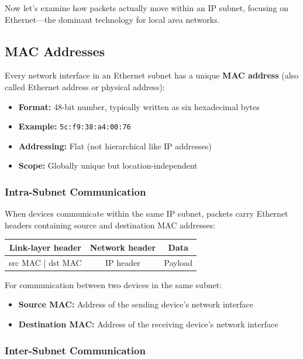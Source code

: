 \documentclass[../../compsys.tex]{subfiles}
\begin{document}
Now let's examine how packets actually move within an IP subnet, focusing on Ethernet---the dominant technology for local area networks.

\subsection{MAC Addresses}

Every network interface in an Ethernet subnet has a unique \textbf{MAC address} (also called Ethernet address or physical address):

\begin{itemize}
    \item \textbf{Format:} 48-bit number, typically written as six hexadecimal bytes
    \item \textbf{Example:} \texttt{5c:f9:38:a4:00:76}
    \item \textbf{Addressing:} Flat (not hierarchical like IP addresses)
    \item \textbf{Scope:} Globally unique but location-independent
\end{itemize}

\subsubsection{Intra-Subnet Communication}

When devices communicate within the same IP subnet, packets carry Ethernet headers containing source and destination MAC addresses:

\begin{center}
\begin{tabular}{|c|c|c|}
\hline
\textbf{Link-layer header} & \textbf{Network header} & \textbf{Data} \\
\hline
src MAC | dst MAC & IP header & Payload \\
\hline
\end{tabular}
\end{center}

For communication between two devices in the same subnet:
\begin{itemize}
    \item \textbf{Source MAC:} Address of the sending device's network interface
    \item \textbf{Destination MAC:} Address of the receiving device's network interface
\end{itemize}

\subsubsection{Inter-Subnet Communication}
\end{document}
